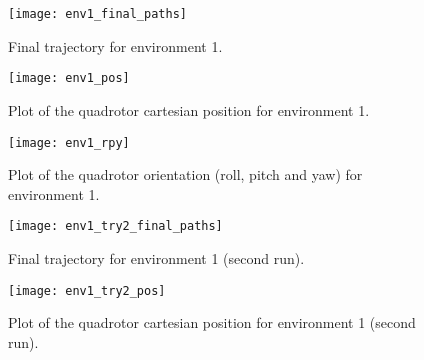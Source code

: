 \documentclass{article}
\begin{document}

  \begin{figure}[H]
    \begin{center}
      \texttt{[image: env1\_final\_paths]}
    \end{center} 
    \caption{Final trajectory for environment 1.}
  \end{figure}

  \begin{figure}[H]
    \begin{center}
      \texttt{[image: env1\_pos]}
    \end{center} 
    \caption{Plot of the quadrotor cartesian position for environment 1.}
  \end{figure}

  \begin{figure}[H]
    \begin{center}
      \texttt{[image: env1\_rpy]}
    \end{center} 
    \caption{Plot of the quadrotor orientation (roll, pitch and yaw) for environment 1.}
  \end{figure}

  \begin{figure}[H]
    \begin{center}
      \texttt{[image: env1\_try2\_final\_paths]}
    \end{center} 
    \caption{Final trajectory for environment 1 (second run).}
  \end{figure}

  \begin{figure}[H]
    \begin{center}
      \texttt{[image: env1\_try2\_pos]}
    \end{center} 
    \caption{Plot of the quadrotor cartesian position for environment 1 (second run).}
  \end{figure}
\end{document}
